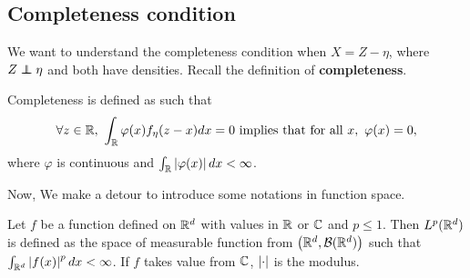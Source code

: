\subsection{Completeness condition}

We want to understand the completeness condition when $X=Z-\eta$, where $Z \perp\!\!\!\!\perp \eta$ and both have densities. 
Recall the definition of \textbf{completeness}.
\begin{definition}[Completeness]
\label{completeness}
Completeness is defined as such that $$
\forall z \in \R,\ \int_\R \varphi(x)f_\eta(z-x)dx=0 \text{ implies that for all } x,\ \varphi(x)=0,$$
where $\varphi$ is continuous and $\int_{\mathbb{R}}  \left| {\varphi(x)}\right|dx <\infty$.
\end{definition}
Now, We make a detour to introduce some notations in function space.
\begin{definition}
    Let $f$ be a function defined on $\mathbb{R}^d$ with values in $\mathbb{R}$ or $\mathbb{C}$ and $p\le 1$. Then $L^p(\mathbb{R}^d)$ is defined as the space of measurable function from $\left(\mathbb{R}^d,\mathcal{B}(\mathbb{R}^d)\right)$ such that $\int_{\mathbb{R}^d}\left| f(x)\right|^p dx<\infty$. If $f$ takes value from $\mathbb{C}$, $\left| \cdot\right|$ is the modulus. 
\end{definition}

